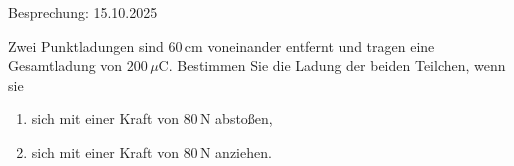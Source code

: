 \documentclass[11pt,a4paper]{article}
\newcounter{exercise}
\newenvironment{exercise}[1][]
  {\refstepcounter{exercise}%
   \begin{tcolorbox}[enhanced, breakable, width=\textwidth,
     colback=blue!5!white,colframe=blue!60!black,
     fonttitle=\bfseries\large,
     title=Aufgabe~\theexercise:~#1]}
  {\end{tcolorbox}}
\newif\ifshowsolutions
\newenvironment{solution}
  {\ifshowsolutions
     \begin{tcolorbox}[enhanced, breakable, width=\textwidth,
       colback=green!5!white,colframe=green!50!black,
       fonttitle=\bfseries\large,
       title=Lösung]}
  {\end{tcolorbox}\fi}
\begin{document}
\begin{tcolorbox}[enhanced, breakable, colback=gray!10!white,
  colframe=gray!70!black, fonttitle=\bfseries\large,
  title={Aufgabenblatt \#1}: Grundlegende Konzepte, sharp corners, width=\textwidth]
\begin{center}
  Besprechung: 15.10.2025
\end{center}
\end{tcolorbox}
\vspace{1cm}

\begin{exercise}[Coulomb-Kraft]
Zwei Punktladungen sind $60\,\text{cm}$ voneinander entfernt und tragen eine Gesamtladung von $200\,\mu\text{C}$. Bestimmen Sie die Ladung der beiden Teilchen, wenn sie
\begin{enumerate}[label=\alph*)]
    \item sich mit einer Kraft von $80\,\text{N}$ abstoßen,
    \item sich mit einer Kraft von $80\,\text{N}$ anziehen.
\end{enumerate}
\end{exercise}

\ifshowsolutions
\begin{solution}
Die Ladungen seien $q_1$ und $q_2$ mit
\[
q_1 + q_2 = Q = 200\times 10^{-6}\,\text{C}.
\]

Die Coulomb-Kraft ist
\begin{align*}
F &= k \frac{|q_1 q_2|}{r^2},\\
k &= 8.99\times 10^9 \,\text{N\,m}^2/\text{C}^2,\\
r &= 0.60\,\text{m},\\
F &= 80\,\text{N}.
\end{align*}

Also gilt
\[
|q_1 q_2| = \frac{F r^2}{k} \approx 3.2\times 10^{-9}\,\text{C}^2,
\]
mit
\[
q_1 q_2 = q_1 (q - q_1).
\]

\begin{enumerate}[label=\alph*)]
\item
\[
q_1 q_2 = +3.2\times 10^{-9} \Rightarrow x^2 - (200\times 10^{-6})x + 3.2\times 10^{-9} = 0
\]
Mit
\[
 a x^2 + b x + c = 0 \Rightarrow x = \frac{-b \pm \sqrt{b^2 - 4ac}}{2a},
\]
\[
q_1 \approx 1.8\times 10^{-4}\,\text{C},\quad
q_2 \approx 1.8\times 10^{-5}\,\text{C}.
\]

\item
\[
q_1 q_2 = -3.2\times 10^{-9} \Rightarrow x^2 - (200\times 10^{-6})x - 3.2\times 10^{-9} = 0
\]
\[
q_1 \approx -1.5\times 10^{-5}\,\text{C},\quad
q_2 \approx 2.1\times 10^{-4}\,\text{C}.
\]
\end{enumerate}
\end{solution}
\fi
\end{document}
